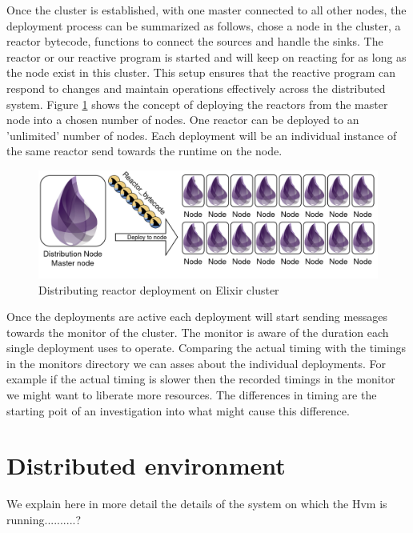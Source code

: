 \documentclass[a4paper]{book}
\begin{document}
Once the cluster is established, with one master connected to all other nodes, the deployment process can be summarized as follows, chose a node in the cluster, a reactor bytecode, functions to connect the sources and handle the sinks. The reactor or our reactive program is started and will keep on reacting for as long as the node exist in this cluster. 
This setup ensures that the reactive program can respond to changes and maintain operations effectively across the distributed system. Figure \ref{fig:rdi} shows the concept of deploying the reactors from the master node into a chosen number of nodes. One reactor can be deployed to an 'unlimited' number of nodes. Each deployment will be an individual instance of the same reactor send towards the runtime on the node. 

\begin{figure}[h]
	\includegraphics[width=\textwidth]{distribution300.drawio}
	\caption{Distributing reactor deployment on Elixir cluster}
	\label{fig:rdi}
\end{figure}  

Once the deployments are active each deployment will start sending messages towards the monitor of the cluster. The monitor is aware of the duration each single deployment uses to operate. Comparing the actual timing with the timings in the monitors directory we can asses about the individual deployments. For example if the actual timing is slower then the recorded timings in the monitor we might want to liberate more resources. The differences in timing are the starting poit of an investigation into what might cause this difference.

\section{Distributed environment}
We explain here in more detail the details of the system on which the Hvm is running..........?
\end{document}

